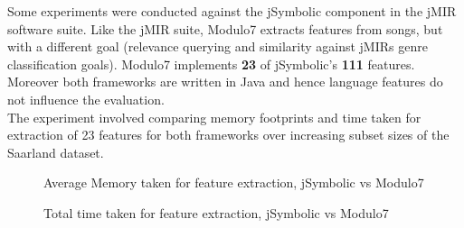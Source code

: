 \documentclass{article}
\begin{document}
Some experiments were conducted against the jSymbolic component in the jMIR \cite{jMIR} software suite. Like the jMIR suite, Modulo7 extracts features from songs, but with a different goal (relevance querying and similarity against jMIRs genre classification goals). Modulo7 implements \textbf{23} of jSymbolic's \textbf{111} features. Moreover both frameworks are written in Java and hence language features do not influence the evaluation. \\ 

\noindent The experiment involved comparing memory footprints and time taken for extraction of 23 features for both frameworks over increasing subset sizes of the Saarland \cite{saarlandmsd} dataset. 

\begin{figure}[h]
\begin{center}
{}
 \caption{Average Memory taken for feature extraction, jSymbolic vs Modulo7}
 \label{fig:MemoryTaken}
\end{center}
\end{figure}

\begin{figure}[h]
\begin{center}
{}
 \caption{Total time taken for feature extraction, jSymbolic vs Modulo7}
 \label{fig:TimeTaken}
\end{center}
\end{figure}
\end{document}
